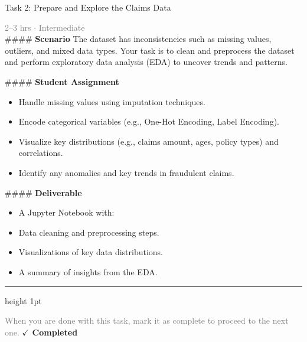 \documentclass[10pt,a4paper]{article}
\begin{document}
\begin{taskbox}{Task 2: Prepare and Explore the Claims Data}

    {\small \textcolor{gray}{2--3 hrs $\cdot$ Intermediate}}\\[12pt]

    \#\#\#\# \textbf{Scenario}
The dataset has inconsistencies such as missing values, outliers, and mixed data types. Your task is to clean and preprocess the dataset and perform exploratory data analysis (EDA) to uncover trends and patterns.

\#\#\#\# \textbf{Student Assignment}
\begin{itemize}
    \item Handle missing values using imputation techniques.
    \item Encode categorical variables (e.g., One-Hot Encoding, Label Encoding).
    \item Visualize key distributions (e.g., claims amount, ages, policy types) and correlations.
    \item Identify any anomalies and key trends in fraudulent claims.
\end{itemize}

\#\#\#\# \textbf{Deliverable}
\begin{itemize}
    \item A Jupyter Notebook with:
    \item Data cleaning and preprocessing steps.
    \item Visualizations of key data distributions.
    \item A summary of insights from the EDA.\par
\end{itemize}

    \vspace{16pt}

    \textcolor{cardBorder}{\hrule height 1pt}\vspace{8pt}

    \small \textcolor{gray}{When you are done with this task, mark it as complete to proceed to the next one.} \hfill \textbf{\textcolor{brandDark}{$\checkmark$ Completed}}

\end{taskbox}
\end{document}
